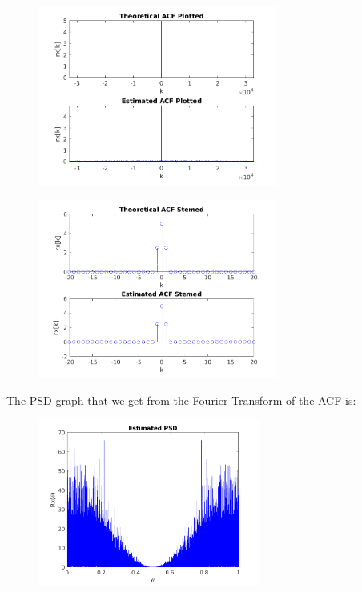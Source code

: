 \documentclass[a4paper,11pt]{article}
\begin{document}
\newpage

\begin{figure}[!hp]
    \begin{center}
      \includegraphics[width=0.7\textwidth]{images/study1/comp_r_ld_plot.png}
    \end{center}
\end{figure}

\begin{figure}[!hp]
    \begin{center}
      \includegraphics[width=0.7\textwidth]{images/study1/comp_r_ld_stem.png}
    \end{center}
\end{figure}

\newpage

The PSD graph that we get from the Fourier Transform of the ACF is:

\begin{figure}[!hp]
    \begin{center}
      \includegraphics[width=0.65\textwidth]{images/study1/R_ld_es.png}
    \end{center}
\end{figure}
\end{document}
